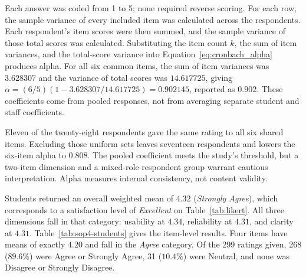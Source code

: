 \documentclass{research}
\begin{document}
\noindent Each answer was coded from 1 to 5; none required reverse
scoring. For each row, the sample variance of every included item was
calculated across the respondents. Each respondent's item scores were
then summed, and the sample variance of those total scores was
calculated. Substituting the item count $k$, the sum of item variances,
and the total-score variance into Equation~\ref{eq:cronbach_alpha}
produces alpha. For all six common items, the sum of item variances was
$3.628307$ and the variance of total scores was $14.617725$, giving
$\alpha=(6/5)(1-3.628307/14.617725)=0.902145$, reported as $0.902$.
These coefficients come from pooled responses, not from averaging
separate student and staff coefficients.

Eleven of the twenty-eight respondents gave the same rating to all six
shared items. Excluding those uniform sets leaves seventeen respondents
and lowers the six-item alpha to $0.808$. The pooled coefficient meets
the study's threshold, but a two-item dimension and a mixed-role
respondent group warrant cautious interpretation. Alpha measures
internal consistency, not content validity.

\label{subsec:sop4-students}

Students returned an overall weighted mean of $4.32$ (\emph{Strongly
Agree}), which corresponds to a satisfaction level of \emph{Excellent}
on Table~\ref{tab:likert}. All three dimensions fall in that category:
usability at $4.34$, reliability at $4.31$, and clarity at $4.31$.
Table~\ref{tab:sop4-students} gives the item-level results. Four items
have means of exactly $4.20$ and fall in the \emph{Agree} category.
Of the 299 ratings given, 268 ($89.6\%$) were Agree or Strongly Agree,
31 ($10.4\%$) were Neutral, and none was Disagree or Strongly Disagree.
\end{document}
